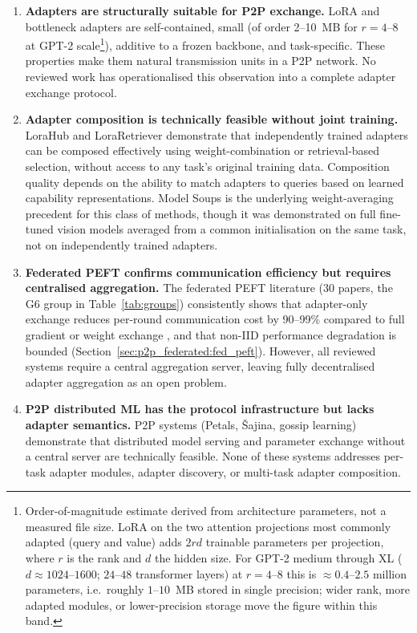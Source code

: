 \begin{enumerate}
  \item \textbf{Adapters are structurally suitable for P2P exchange.} LoRA and
    bottleneck adapters are self-contained, small (of order 2--10~MB for
    $r = 4$--$8$ at GPT-2 scale\footnote{Order-of-magnitude estimate derived
    from architecture parameters, not a measured file size. LoRA on the two
    attention projections most commonly adapted (query and value) adds $2rd$
    trainable parameters per projection, where $r$ is the rank and $d$ the
    hidden size. For GPT-2 medium through XL ($d \approx 1024$--$1600$;
    $24$--$48$ transformer layers) at $r = 4$--$8$ this is $\approx 0.4$--$2.5$
    million parameters, i.e.\ roughly $1$--$10$~MB stored in single precision;
    wider rank, more adapted modules, or lower-precision storage move the figure
    within this band.}), additive to a frozen backbone, and task-specific. These properties
    make them natural transmission units in a P2P network. No reviewed work has operationalised this observation into a complete adapter exchange protocol.

  \item \textbf{Adapter composition is technically feasible without joint training.}
    LoraHub \cite{Huang2023} and LoraRetriever \cite{ZhaoLoraRetriever2024} demonstrate
    that independently trained adapters can be composed effectively using
    weight-combination or retrieval-based selection, without access to any task's
    original training data. Composition quality
    depends on the ability to match adapters to queries based on learned capability
    representations. Model Soups \cite{Wortsman2022} is the underlying weight-averaging
    precedent for this class of methods, though it was demonstrated on full
    fine-tuned vision models averaged from a common initialisation on the same
    task, not on independently trained adapters.

  \item \textbf{Federated PEFT confirms communication efficiency but requires
    centralised aggregation.} The federated PEFT literature (30 papers, the
    G6 group in Table~\ref{tab:groups}) consistently
    shows that adapter-only exchange reduces per-round communication cost by
    90--99\% compared to full gradient or weight exchange
    \cite{ZhangFedPETuning2023}, and that non-IID performance degradation is
    bounded (Section~\ref{sec:p2p_federated:fed_peft}).
    However, all reviewed systems require a central aggregation server, leaving fully
    decentralised adapter aggregation as an open problem.

  \item \textbf{P2P distributed ML has the protocol infrastructure but lacks adapter
    semantics.} P2P systems (Petals, Šajina, gossip learning) demonstrate that
    distributed model serving and parameter exchange without a central server are
    technically feasible. None of these systems addresses per-task adapter modules,
    adapter discovery, or multi-task adapter composition.
\end{enumerate}

